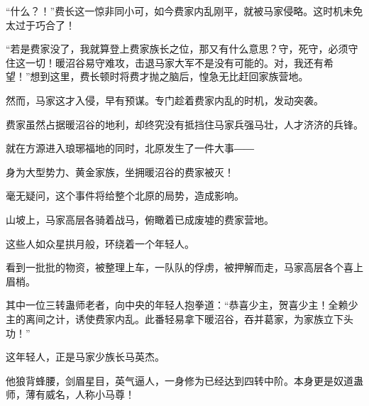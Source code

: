 \begin{this_body}
“什么？！”费长这一惊非同小可，如今费家内乱刚平，就被马家侵略。这时机未免太过于巧合了！

“若是费家没了，我就算登上费家族长之位，那又有什么意思？守，死守，必须守住这一切！暖沼谷易守难攻，击退马家大军不是没有可能的。对，我还有希望！”想到这里，费长顿时将费才抛之脑后，惶急无比赶回家族营地。

然而，马家这才入侵，早有预谋。专门趁着费家内乱的时机，发动突袭。

费家虽然占据暖沼谷的地利，却终究没有抵挡住马家兵强马壮，人才济济的兵锋。

就在方源进入琅琊福地的同时，北原发生了一件大事――

身为大型势力、黄金家族，坐拥暖沼谷的费家被灭！

毫无疑问，这个事件将给整个北原的局势，造成影响。

山坡上，马家高层各骑着战马，俯瞰着已成废墟的费家营地。

这些人如众星拱月般，环绕着一个年轻人。

看到一批批的物资，被整理上车，一队队的俘虏，被押解而走，马家高层各个喜上眉梢。

其中一位三转蛊师老者，向中央的年轻人抱拳道：“恭喜少主，贺喜少主！全赖少主的离间之计，诱使费家内乱。此番轻易拿下暖沼谷，吞并葛家，为家族立下头功！”

这年轻人，正是马家少族长马英杰。

他狼背蜂腰，剑眉星目，英气逼人，一身修为已经达到四转中阶。本身更是奴道蛊师，薄有威名，人称小马尊！

\end{this_body}

